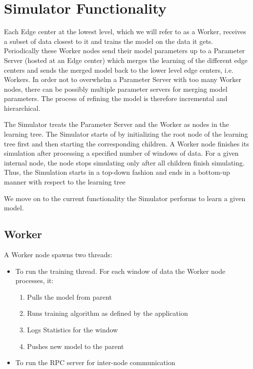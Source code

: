 \documentclass[a4paper, 12pt]{article}
\begin{document}
\section{Simulator Functionality} 
Each Edge center at the lowest level, which we will refer to as a Worker, receives a subset of data closest to it and trains the model on the data it gets. Periodically these Worker nodes send their model parameters up to a Parameter Server (hosted at an Edge center) which merges the learning of the different edge centers and sends the merged model back to the lower level edge centers, i.e. Workers. In order not to overwhelm a Parameter Server with too many Worker nodes, there can be possibly multiple parameter servers for merging model parameters. The process of refining the model is therefore incremental and hierarchical. 

The Simulator treats the Parameter Server and the Worker as nodes in the learning tree. The Simulator starts of by initializing the root node of the learning tree first and then starting the corresponding children. A Worker node finishes its simulation after processing a specified number of windows of data. For a given internal node, the node stops simulating only after all children finish simulating. Thus, the Simulation starts in a top-down fashion and ends in a bottom-up manner with respect to the learning tree

We move on to the current functionality the Simulator performs to learn a given model.

\subsection{Worker}
A Worker node spawns two threads:
\begin{itemize}
    \item To run the training thread. For each window of data the Worker node processes, it:
    \begin{enumerate}
        \item Pulls the model from parent 
        \item Runs training algorithm as defined by the application
        \item Logs Statistics for the window
        \item Pushes new model to the parent 
    \end{enumerate}
    \item To run the RPC server for inter-node communication
\end{itemize}
\end{document}
